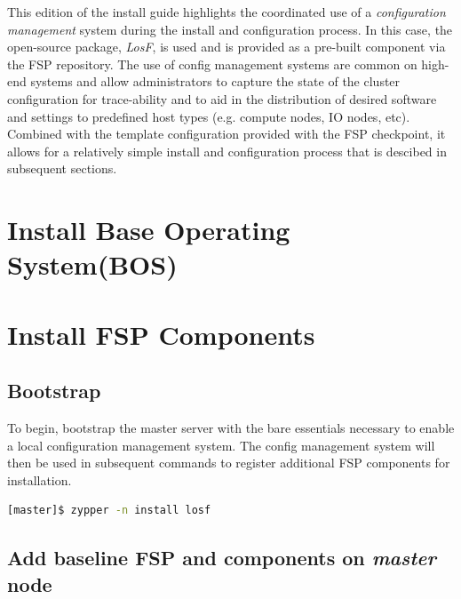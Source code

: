 \documentclass[letterpaper]{article}
\newcommand{\LosF}{\emph{LosF}}
\begin{document}
This edition of the install guide highlights the coordinated use of a {\em
  configuration management} system during the install and configuration
process. In this case, the open-source package, \LosF{}, is used and is
provided as a pre-built component via the FSP repository. The use of config
management systems are common on high-end systems and allow administrators to
capture the state of the cluster configuration for trace-ability and to aid in
the distribution of desired software and settings to predefined host types
(e.g. compute nodes, IO nodes, etc). Combined with the template configuration
provided with the FSP checkpoint, it allows for a relatively simple install and
configuration process that is descibed in subsequent sections. \\





\section{Install Base Operating System(BOS)}



\section{Install FSP Components}

\subsection{Bootstrap}

To begin, bootstrap the master server with the bare essentials necessary to
enable a local configuration management system. The config management system
will then be used in subsequent commands to register additional FSP components
for installation.

\vspace*{0.2cm}

\begin{lstlisting}[language=bash]
[master]$ zypper -n install losf
\end{lstlisting}


\subsection{Add baseline FSP and components on {\em master} node}
\end{document}
